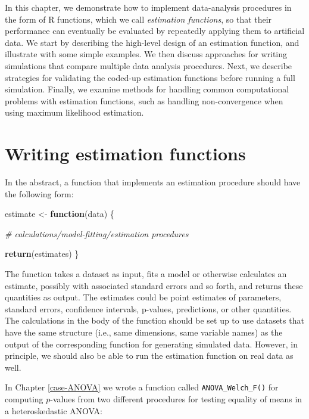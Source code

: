 \documentclass[
]{book}
\newenvironment{Shaded}{\begin{snugshade}}{\end{snugshade}}
\newcommand{\CommentTok}[1]{\textcolor[rgb]{0.56,0.35,0.01}{\textit{#1}}}
\newcommand{\ControlFlowTok}[1]{\textcolor[rgb]{0.13,0.29,0.53}{\textbf{#1}}}
\newcommand{\FunctionTok}[1]{\textcolor[rgb]{0.13,0.29,0.53}{\textbf{#1}}}
\newcommand{\NormalTok}[1]{#1}
\newcommand{\OtherTok}[1]{\textcolor[rgb]{0.56,0.35,0.01}{#1}}
\begin{document}
In this chapter, we demonstrate how to implement data-analysis procedures in the form of R functions, which we call \emph{estimation functions}, so that their performance can eventually be evaluated by repeatedly applying them to artificial data.
We start by describing the high-level design of an estimation function, and illustrate with some simple examples.
We then discuss approaches for writing simulations that compare multiple data analysis procedures.
Next, we describe strategies for validating the coded-up estimation functions before running a full simulation.
Finally, we examine methods for handling common computational problems with estimation functions, such as handling non-convergence when using maximum likelihood estimation.

\section{Writing estimation functions}\label{estimation-functions}

In the abstract, a function that implements an estimation procedure should have the following form:

\begin{Shaded}
\begin{Highlighting}[]
\NormalTok{estimate }\OtherTok{\textless{}{-}} \ControlFlowTok{function}\NormalTok{(data) \{}

  \CommentTok{\# calculations/model{-}fitting/estimation procedures}
  
  \FunctionTok{return}\NormalTok{(estimates)}
\NormalTok{\}}
\end{Highlighting}
\end{Shaded}

The function takes a dataset as input, fits a model or otherwise calculates an estimate, possibly with associated standard errors and so forth, and returns these quantities as output.
The estimates could be point estimates of parameters, standard errors, confidence intervals, p-values, predictions, or other quantities.
The calculations in the body of the function should be set up to use datasets that have the same structure (i.e., same dimensions, same variable names) as the output of the corresponding function for generating simulated data.
However, in principle, we should also be able to run the estimation function on real data as well.

In Chapter \ref{case-ANOVA} we wrote a function called \texttt{ANOVA\_Welch\_F()} for computing \(p\)-values from two different procedures for testing equality of means in a heteroskedastic ANOVA:
\end{document}
